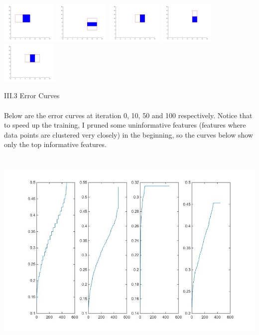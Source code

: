 \documentclass[12pt]{article}
\newenvironment{p2}[2][III Adaboost for Classifier Selection]{\begin{trivlist}
\item[\hskip \labelsep {\bfseries #1}\hskip \labelsep {\bfseries #2}]}{\end{trivlist}}
\begin{document}
\begin{p2}{}
\begin{center}
\end{center}
\begin{center}
		\includegraphics[height=2cm]{features/top6.jpg}
		\includegraphics[height=2cm]{features/top7.jpg}
		\includegraphics[height=2cm]{features/top8.jpg}
		\includegraphics[height=2cm]{features/top9.jpg}
		\includegraphics[height=2cm]{features/top10.jpg}
\end{center}
\item{III.3 Error Curves\\\\}
Below are the error curves at iteration 0, 10, 50 and 100 respectively. Notice that to speed up the training, I pruned some uninformative features (features where data points are clustered very closely) in the beginning, so the curves below show only the top informative features.
\begin{center}
		\includegraphics[height=10cm]{data/error_curve.jpg}

\end{center}
\end{p2}
\end{document}
